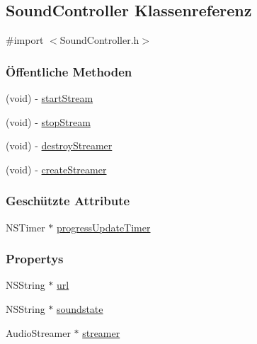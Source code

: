 \hypertarget{interface_sound_controller}{
\subsection{SoundController Klassenreferenz}
\label{interface_sound_controller}
}


{\ttfamily \#import $<$SoundController.h$>$}\subsubsection*{Öffentliche Methoden}
\begin{DoxyCompactItemize}
\item 
(void) -\/ \hyperlink{interface_sound_controller_a8f28bc622fc0b8aae6d7303dfb05aa6e}{startStream}
\item 
(void) -\/ \hyperlink{interface_sound_controller_aff4b12f990cd30515c83f12942f957f3}{stopStream}
\item 
(void) -\/ \hyperlink{interface_sound_controller_ae9f575ccb48dda60213d90afb965f13c}{destroyStreamer}
\item 
(void) -\/ \hyperlink{interface_sound_controller_a013cdcefe5418a9bcd7efbefb7f954a9}{createStreamer}
\end{DoxyCompactItemize}
\subsubsection*{Geschützte Attribute}
\begin{DoxyCompactItemize}
\item 
NSTimer $\ast$ \hyperlink{interface_sound_controller_a9a7042c00cd9fbe5fdc18719360d0b89}{progressUpdateTimer}
\end{DoxyCompactItemize}
\subsubsection*{Propertys}
\begin{DoxyCompactItemize}
\item 
NSString $\ast$ \hyperlink{interface_sound_controller_a0cbc2733aa7a4a4d8aa8d41831ecfe75}{url}
\item 
NSString $\ast$ \hyperlink{interface_sound_controller_a1fc59135a0c0376ae7cb7847f6265db7}{soundstate}
\item 
AudioStreamer $\ast$ \hyperlink{interface_sound_controller_a87f7a4b2a4565b68491091dd6a4df1be}{streamer}
\end{DoxyCompactItemize}


